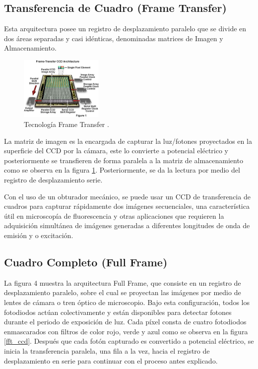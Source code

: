 \documentclass[conference]{IEEEtran}
\begin{document}
\subsection{\textbf{Transferencia de Cuadro (Frame Transfer)}}
Esta arquitectura posee un registro de desplazamiento paralelo que se divide en dos áreas separadas y casi idénticas, denominadas matrices de Imagen y Almacenamiento.

\begin{figure}[H]
\centering
\includegraphics[width=4cm]{ft_ccd}
\caption{Tecnología Frame Transfer \cite{ft_ccd}.}
\label{ft_ccd}
\end{figure}

La matriz de imagen es la encargada de capturar la luz/fotones proyectados en la superficie del CCD por la cámara, este lo convierte a potencial eléctrico y posteriormente se transfieren de forma paralela a la matriz de almacenamiento como se observa en la figura \ref{ft_ccd}. Posteriormente, se da la lectura por medio del registro de desplazamiento serie.

Con el uso de un obturador mecánico, se puede usar un CCD de transferencia de cuadros para capturar rápidamente dos imágenes secuenciales, una característica útil en microscopía de fluorescencia y otras aplicaciones que requieren la adquisición simultánea de imágenes generadas a diferentes longitudes de onda de emisión y o excitación\cite{ft_ccd}.

\subsection{ \textbf{Cuadro Completo (Full Frame)}}
La figura 4 muestra la arquitectura Full Frame, que consiste en un registro de desplazamiento paralelo, sobre el cual se proyectan las imágenes por medio de lentes de cámara o tren óptico de microscopio. Bajo esta configuración, todos los fotodiodos actúan colectivamente y están disponibles para detectar fotones durante el periodo de exposición de luz. Cada píxel consta de cuatro fotodiodos enmascarados con filtros de color rojo, verde y azul como se observa en la figura \ref{fft_ccd}. Después que cada fotón capturado es convertido a potencial eléctrico, se inicia la transferencia paralela, una fila a la vez, hacia el registro de desplazamiento en serie para continuar con el proceso antes explicado\cite{andor}.
\end{document}
